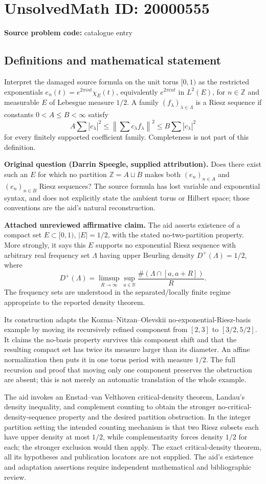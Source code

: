 \documentclass[11pt]{article}
\newcommand{\Z}{\mathbb{Z}}
\newcommand{\R}{\mathbb{R}}
\begin{document}
\section*{UnsolvedMath ID: 20000555}
\textbf{Source problem code:} catalogue entry
\subsection{Definitions and mathematical statement}
Interpret the damaged source formula on the unit torus $[0,1)$ as the restricted exponentials $e_n(t)=e^{2\pi int}\chi_E(t)$, equivalently $e^{2\pi int}$ in $L^2(E)$, for $n\in\Z$ and measurable $E$ of Lebesgue measure $1/2$. A family $(f_\lambda)_{\lambda\in\Lambda}$ is a Riesz sequence if constants $0<A\le B<\infty$ satisfy
\[A\sum|c_\lambda|^2\le\left\|\sum c_\lambda f_\lambda\right\|^2\le B\sum|c_\lambda|^2\]
for every finitely supported coefficient family. Completeness is not part of this definition.

\textbf{Original question (Darrin Speegle, supplied attribution).} Does there exist such an $E$ for which no partition $\Z=A\sqcup B$ makes both $(e_n)_{n\in A}$ and $(e_n)_{n\in B}$ Riesz sequences? The source formula has lost variable and exponential syntax, and does not explicitly state the ambient torus or Hilbert space; those conventions are the aid's natural reconstruction.

\textbf{Attached unreviewed affirmative claim.} The aid asserts existence of a compact set $E\subset[0,1)$, $|E|=1/2$, with the stated no-two-partition property. More strongly, it says this $E$ supports no exponential Riesz sequence with arbitrary real frequency set $\Lambda$ having upper Beurling density $D^+(\Lambda)=1/2$, where
\[D^+(\Lambda)=\limsup_{R\to\infty}\sup_{a\in\R}\frac{\#(\Lambda\cap[a,a+R])}{R}.\]
The frequency sets are understood in the separated/locally finite regime appropriate to the reported density theorem.

Its construction adapts the Kozma--Nitzan--Olevskii no-exponential-Riesz-basis example by moving its recursively refined component from $[2,3]$ to $[3/2,5/2]$. It claims the no-basis property survives this component shift and that the resulting compact set has twice its measure larger than its diameter. An affine normalization then puts it in one torus period with measure $1/2$. The full recursion and proof that moving only one component preserves the obstruction are absent; this is not merely an automatic translation of the whole example.

The aid invokes an Enstad--van Velthoven critical-density theorem, Landau's density inequality, and complement counting to obtain the stronger no-critical-density-sequence property and the desired partition obstruction. In the integer partition setting the intended counting mechanism is that two Riesz subsets each have upper density at most $1/2$, while complementarity forces density $1/2$ for each; the stronger exclusion would then apply. The exact critical-density theorem, all its hypotheses and publication locators are not supplied. The aid's existence and adaptation assertions require independent mathematical and bibliographic review.
\end{document}
